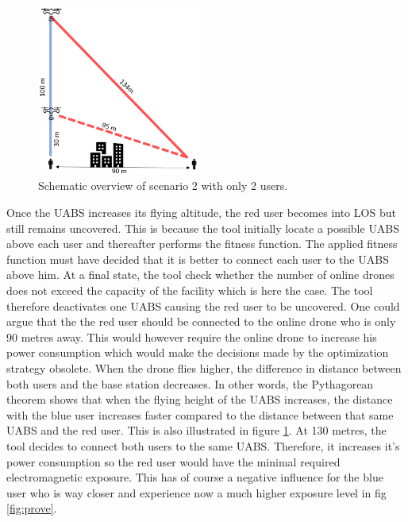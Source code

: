 \begin{figure}
  \begin{center}
    \includegraphics[width=0.48\textwidth]{../results/s2/proveScenario.png}
  \end{center}
  \caption{Schematic overview of scenario 2 with only 2 users.}
  \label{fig:schematicprove}
\end{figure}
Once the \gls{UABS} increases its flying altitude, the red user becomes into \gls{LOS} but still remains uncovered. This is because the tool initially locate a possible 
\gls{UABS} above each user and thereafter performs the  fitness function. The applied fitness function must have decided that it is better to connect 
each user to the \gls{UABS} above him. At a final state, the tool check whether the number of online drones does not exceed the capacity of the facility
which is here the case. The tool therefore deactivates one \gls{UABS} causing the red user to be uncovered. One could argue that the 
the red user should be connected to the online drone who is only 90 metres away. This would however require the online drone to increase his power consumption which 
would make the decisions made by the optimization strategy obsolete.
When the drone flies higher, the difference in distance between both users and the base station decreases. In other words, the Pythagorean theorem shows that when the flying height of the 
\gls{UABS} increases, the distance with the blue user increases faster compared to the distance between that same \gls{UABS} and the red user. This is also illustrated in figure \ref{fig:schematicprove}.
At 130 metres, the tool decides to connect both users to the same \gls{UABS}. Therefore, it increases it's power consumption so the red user would  have the minimal 
required electromagnetic exposure. This has of course a negative influence for the blue user who is way closer and experience now a much higher exposure level in fig \ref{fig:prove}.
